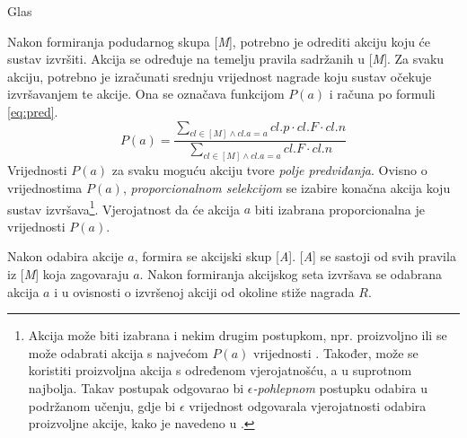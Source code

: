 \documentclass[times, utf8, zavrsni]{fer}
\begin{document}
\begin{algorithm}
    \caption{Glas}
    \label{vote}
    \begin{algorithmic}
        \ENDIF
    \end{algorithmic}
\end{algorithm}

Nakon formiranja podudarnog skupa [\emph{M}], potrebno je odrediti akciju koju će sustav izvršiti.
Akcija se određuje na temelju pravila sadržanih u [\emph{M}].
Za svaku akciju, potrebno je izračunati srednju vrijednost nagrade koju sustav očekuje izvršavanjem te akcije.
Ona se označava funkcijom $P(a)$ i računa po formuli \eqref{eq:pred}.
\begin{equation}
    \label{eq:pred}
    P(a) = \frac{\sum_{cl \in [M] \land cl.a = a} cl.p \cdot cl.F \cdot cl.n}{\sum_{cl \in [M] \land cl.a = a} cl.F \cdot cl.n}
\end{equation}
Vrijednosti $P(a)$ za svaku moguću akciju tvore \emph{polje predviđanja}.
Ovisno o vrijednostima $P(a)$, \emph{proporcionalnom selekcijom} se izabire konačna akcija koju sustav izvršava\footnote{Akcija može biti izabrana i nekim drugim postupkom, npr. proizvoljno  ili se može odabrati akcija s najvećom $P(a)$ vrijednosti .
Također, može se koristiti proizvoljna akcija s određenom vjerojatnošću, a u suprotnom najbolja.
Takav postupak odgovarao bi \emph{$\epsilon$-pohlepnom}  postupku odabira u podržanom učenju, gdje bi $\epsilon$ vrijednost odgovarala vjerojatnosti odabira proizvoljne akcije, kako je navedeno u \citep{1}.}.
Vjerojatnost da će akcija $a$ biti izabrana proporcionalna je vrijednosti $P(a)$.

Nakon odabira akcije $a$, formira se akcijski skup [\emph{A}].
[\emph{A}] se sastoji od svih pravila iz [\emph{M}] koja zagovaraju $a$.
Nakon formiranja akcijskog seta izvršava se odabrana akcija $a$ i u ovisnosti o izvršenoj akciji od okoline stiže nagrada $R$.
\end{document}
